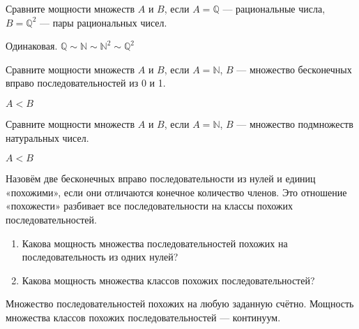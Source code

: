 \begin{problem}
Сравните мощности множеств $ A $ и $ B $, если $ A=\mathbb{Q} $ — рациональные числа, $ B=\mathbb{Q}^{2} $ — пары рациональных чисел.

\begin{sol}
Одинаковая. $ \mathbb{Q}\sim \mathbb{N}\sim \mathbb{N}^{2}\sim \mathbb{Q}^{2} $
\end{sol}
\end{problem}

\begin{problem}
Сравните мощности множеств $A$ и $B$, если $A=\mathbb{N}$, $B$ — множество бесконечных вправо последовательностей из 0 и 1.

\begin{sol}
$A<B$
\end{sol}
\end{problem}

\begin{problem}
Сравните мощности множеств $A$ и $B$, если $A=\mathbb{N}$, $B$ — множество подмножеств натуральных чисел.

\begin{sol}
$A<B$
\end{sol}
\end{problem}

\begin{problem}
Назовём две бесконечных вправо последовательности из нулей и единиц «похожими», если они отличаются конечное количество членов. Это отношение «похожести» разбивает все последовательности на классы похожих последовательностей.

\begin{enumerate}
\item Какова мощность множества последовательностей похожих на последовательность из одних нулей?
\item Какова мощность множества классов похожих последовательностей?
\end{enumerate}

\begin{sol}
Множество последовательностей похожих на любую заданную счётно. Мощность множества классов похожих последовательностей — континуум.
\end{sol}
\end{problem}

